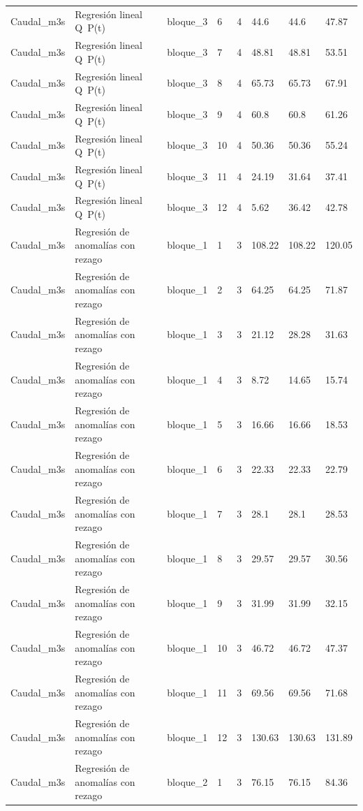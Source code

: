\begin{longtable}{llllllll}
Caudal\_m3s & Regresión lineal Q~P(t) & bloque\_3 & 6 & 4 & 44.6 & 44.6 & 47.87 \\
Caudal\_m3s & Regresión lineal Q~P(t) & bloque\_3 & 7 & 4 & 48.81 & 48.81 & 53.51 \\
Caudal\_m3s & Regresión lineal Q~P(t) & bloque\_3 & 8 & 4 & 65.73 & 65.73 & 67.91 \\
Caudal\_m3s & Regresión lineal Q~P(t) & bloque\_3 & 9 & 4 & 60.8 & 60.8 & 61.26 \\
Caudal\_m3s & Regresión lineal Q~P(t) & bloque\_3 & 10 & 4 & 50.36 & 50.36 & 55.24 \\
Caudal\_m3s & Regresión lineal Q~P(t) & bloque\_3 & 11 & 4 & 24.19 & 31.64 & 37.41 \\
Caudal\_m3s & Regresión lineal Q~P(t) & bloque\_3 & 12 & 4 & 5.62 & 36.42 & 42.78 \\
Caudal\_m3s & Regresión de anomalías con rezago & bloque\_1 & 1 & 3 & 108.22 & 108.22 & 120.05 \\
Caudal\_m3s & Regresión de anomalías con rezago & bloque\_1 & 2 & 3 & 64.25 & 64.25 & 71.87 \\
Caudal\_m3s & Regresión de anomalías con rezago & bloque\_1 & 3 & 3 & 21.12 & 28.28 & 31.63 \\
Caudal\_m3s & Regresión de anomalías con rezago & bloque\_1 & 4 & 3 & 8.72 & 14.65 & 15.74 \\
Caudal\_m3s & Regresión de anomalías con rezago & bloque\_1 & 5 & 3 & 16.66 & 16.66 & 18.53 \\
Caudal\_m3s & Regresión de anomalías con rezago & bloque\_1 & 6 & 3 & 22.33 & 22.33 & 22.79 \\
Caudal\_m3s & Regresión de anomalías con rezago & bloque\_1 & 7 & 3 & 28.1 & 28.1 & 28.53 \\
Caudal\_m3s & Regresión de anomalías con rezago & bloque\_1 & 8 & 3 & 29.57 & 29.57 & 30.56 \\
Caudal\_m3s & Regresión de anomalías con rezago & bloque\_1 & 9 & 3 & 31.99 & 31.99 & 32.15 \\
Caudal\_m3s & Regresión de anomalías con rezago & bloque\_1 & 10 & 3 & 46.72 & 46.72 & 47.37 \\
Caudal\_m3s & Regresión de anomalías con rezago & bloque\_1 & 11 & 3 & 69.56 & 69.56 & 71.68 \\
Caudal\_m3s & Regresión de anomalías con rezago & bloque\_1 & 12 & 3 & 130.63 & 130.63 & 131.89 \\
Caudal\_m3s & Regresión de anomalías con rezago & bloque\_2 & 1 & 3 & 76.15 & 76.15 & 84.36 \\

\end{longtable}
